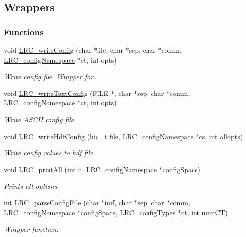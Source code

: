 \hypertarget{group___l_r_c__wrappers}{
\subsection{Wrappers}
\label{group___l_r_c__wrappers}
}
\subsubsection*{Functions}
\begin{CompactItemize}
\item 
void \hyperlink{group___l_r_c__wrappers_g51e21668c4d2e0f397b7d20ac8b9cc50}{LRC\_\-writeConfig} (char $\ast$file, char $\ast$sep, char $\ast$comm, \hyperlink{struct_l_r_c__config_namespace}{LRC\_\-configNamespace} $\ast$ct, int opts)
\begin{CompactList}\small\item\em Write config file. Wrapper for. \item\end{CompactList}\item 
void \hyperlink{group___l_r_c__wrappers_g42c90a023c4cc3048b39a65245e889e4}{LRC\_\-writeTextConfig} (FILE $\ast$, char $\ast$sep, char $\ast$comm, \hyperlink{struct_l_r_c__config_namespace}{LRC\_\-configNamespace} $\ast$ct, int opts)
\begin{CompactList}\small\item\em Write ASCII config file. \item\end{CompactList}\item 
void \hyperlink{group___l_r_c__wrappers_g142e285d5c8a3e6761d1a86668cfe9eb}{LRC\_\-writeHdfConfig} (hid\_\-t file, \hyperlink{struct_l_r_c__config_namespace}{LRC\_\-configNamespace} $\ast$cs, int allopts)
\begin{CompactList}\small\item\em Write config values to hdf file. \item\end{CompactList}\item 
void \hyperlink{group___l_r_c__wrappers_g434aa10adcbb1572b06ed29b01187716}{LRC\_\-printAll} (int n, \hyperlink{struct_l_r_c__config_namespace}{LRC\_\-configNamespace} $\ast$configSpace)
\begin{CompactList}\small\item\em Prints all options. \item\end{CompactList}\item 
int \hyperlink{group___l_r_c__wrappers_g98adf1a77ae325830d4521b691ca33b0}{LRC\_\-parseConfigFile} (char $\ast$inif, char $\ast$sep, char $\ast$comm, \hyperlink{struct_l_r_c__config_namespace}{LRC\_\-configNamespace} $\ast$configSpace, \hyperlink{struct_l_r_c__config_types}{LRC\_\-configTypes} $\ast$ct, int numCT)
\begin{CompactList}\small\item\em Wrapper function. \item\end{CompactList}\end{CompactItemize}


